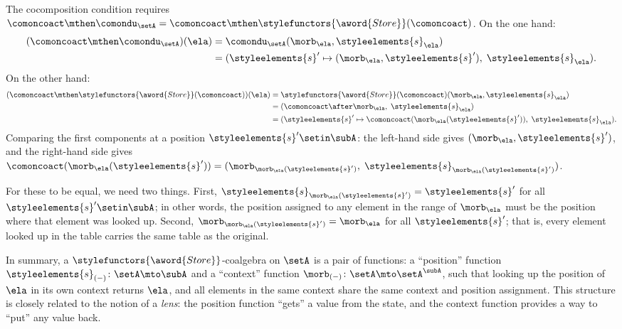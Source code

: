 \begin{example}
The cocomposition condition requires $\comoncoact \mthen \comondu_\setA = \comoncoact \mthen \stylefunctors{\aword{Store}}(\comoncoact)$. On the one hand:
\begin{align*}
(\comoncoact \mthen \comondu_\setA)(\ela)
& = \comondu_\setA(\morb_\ela, \styleelements{s}_\ela) \\
& = (\styleelements{s}' \mapsto (\morb_\ela, \styleelements{s}'),\; \styleelements{s}_\ela).
\end{align*}
On the other hand:
\begin{align*}
(\comoncoact \mthen \stylefunctors{\aword{Store}}(\comoncoact))(\ela)
& = \stylefunctors{\aword{Store}}(\comoncoact)(\morb_\ela, \styleelements{s}_\ela) \\
& = (\comoncoact \after \morb_\ela,\; \styleelements{s}_\ela) \\
& = (\styleelements{s}' \mapsto \comoncoact(\morb_\ela(\styleelements{s}')),\; \styleelements{s}_\ela).
\end{align*}
Comparing the first components at a position $\styleelements{s}' \setin \subA$: the left-hand side gives $(\morb_\ela, \styleelements{s}')$, and the right-hand side gives $\comoncoact(\morb_\ela(\styleelements{s}')) = (\morb_{\morb_\ela(\styleelements{s}')},\; \styleelements{s}_{\morb_\ela(\styleelements{s}')})$.

For these to be equal, we need two things. First, $\styleelements{s}_{\morb_\ela(\styleelements{s}')} = \styleelements{s}'$ for all $\styleelements{s}' \setin \subA$; in other words, the position assigned to any element in the range of $\morb_\ela$ must be the position where that element was looked up. Second, $\morb_{\morb_\ela(\styleelements{s}')} = \morb_\ela$ for all $\styleelements{s}'$; that is, every element looked up in the table carries the same table as the original.

In summary, a $\stylefunctors{\aword{Store}}$-coalgebra on $\setA$ is a pair of functions: a ``position'' function $\styleelements{s}_{(-)} \colon \setA \mto \subA$ and a ``context'' function $\morb_{(-)} \colon \setA \mto \setA^{\subA}$, such that looking up the position of $\ela$ in its own context returns $\ela$, and all elements in the same context share the same context and position assignment. This structure is closely related to the notion of a \emph{lens}: the position function ``gets'' a value from the state, and the context function provides a way to ``put'' any value back.
\end{example}


